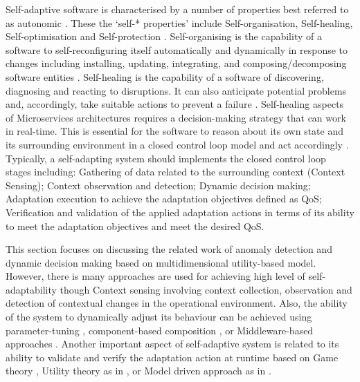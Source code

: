 \documentclass[sigconf]{acmart}
\begin{document}
Self-adaptive software is characterised by a number of properties best referred to as   autonomic \cite{jelasityself}. These the `self-* properties' include Self-organisation, Self-healing, Self-optimisation and Self-protection  \cite{horn:2001p3735}. Self-organising is the capability of a software to self-reconfiguring itself automatically and dynamically in response to changes including installing, updating, integrating, and composing/decomposing software entities \cite{Salehie:2009p3693}. Self-healing is the capability of a software of discovering, diagnosing and reacting to disruptions. It can also anticipate potential problems and, accordingly, take suitable actions to prevent a failure \cite{horn:2001p3735}. 
Self-healing aspects of Microservices architectures requires a decision-making strategy that can work in real-time. This is essential for the software to reason about its own state and its surrounding environment in a closed control loop model and act accordingly \cite{Cheng:2008p3708}.  
Typically, a self-adapting system should implements the closed control loop stages including: Gathering of data related to the surrounding context (Context Sensing); Context observation and detection; Dynamic decision making; Adaptation execution to achieve the adaptation objectives defined as QoS; Verification and validation of the applied adaptation actions in terms of its ability to meet the adaptation objectives and meet the desired QoS.

This section focuses on discussing the related work of anomaly detection and dynamic decision making based on multidimensional utility-based model. However, there is many approaches are used for achieving high level of self-adaptability though Context sensing involving context collection, observation and detection of contextual changes in the operational environment. Also, the ability of the system to dynamically adjust its behaviour can be achieved using parameter-tuning \cite{Cheng:2009p3902}, component-based composition \cite{MariusMikalsen:2005ur}, or Middleware-based  approaches \cite{CheungFooWo:2007p1692}. Another important aspect of self-adaptive system is related to its ability to validate and verify the adaptation action at runtime based on Game theory \cite{Wei:2016ge}, Utility theory as in \cite{Menasce:2007vq,KonstantinosKakousis:2008ub}, or Model driven approach as in \cite{Sama:2008p3765}.
\end{document}

